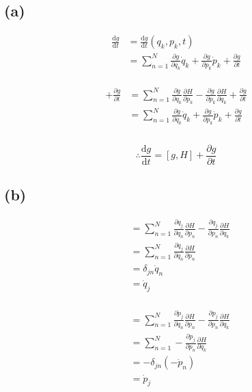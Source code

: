 \documentclass[letter, 10pts]{article}
\begin{document}
\subsection*{(a)}
\begin{minipage}{0.5\textwidth}
	\begin{align*}
		\frac{\mathrm{d} g}{\mathrm{d} t} 
		&= 
		\frac{\mathrm{d} g}{\mathrm{d} t}\left(
		q_k, p_k, t\right)\\
		&= 
		\sum_{n=1}^{N} 
		\frac{\partial g}{\partial q_k} 
		\dot{q}_k + 
		\frac{\partial g}{\partial p_k}
		\dot{p}_k + 
		\frac{\partial g}{\partial t}\\
	\end{align*}
\end{minipage}\hfill 
\begin{minipage}{0.5\textwidth}
\begin{align*}
	[g,H] + \frac{\partial g}{\partial t} 
	&= 
	\sum_{n=1}^{N} \frac{\partial g}{\partial q_k} 
	\frac{\partial H}{\partial p_k} - 
	\frac{\partial g}{\partial p_k} 
	\frac{\partial H}{\partial q_k} + \frac{\partial g}{\partial t}\\
	&= 
		\sum_{n=1}^{N} 
		\frac{\partial g}{\partial q_k} 
		\dot{q}_k + 
		\frac{\partial g}{\partial p_k}
		\dot{p}_k + 
		\frac{\partial g}{\partial t}\\
	\\
\end{align*}	
\end{minipage}
\[
	\therefore \frac{\mathrm{d} g}{\mathrm{d} t} = [g,H]+ \frac{\partial g}{\partial t}
\] 


\subsection*{(b)} 
\begin{minipage}{0.5\textwidth}
\begin{align*}
	[q_j, H] &= \sum_{n=1}^{N} \frac{\partial q_j}{\partial q_n} 
	\frac{\partial H}{\partial p_n}-
	\frac{\partial q_j}{\partial p_n} 
	\frac{\partial H}{\partial q_k}\\
	&= \sum_{n=1}^{N} \frac{\partial q_j}{\partial q_n} 
	\frac{\partial H}{\partial p_n}
		 \\ &= \delta_{jn} \dot q_n
		 \\
		 &= \dot q_j \\
\end{align*}	
\end{minipage} \hfill 
\begin{minipage}{0.5\textwidth}
\begin{align*}
	[p_j, H] &= \sum_{n=1}^{N} \frac{\partial p_j}{\partial q_n} 
	\frac{\partial H}{\partial p_n}-
	\frac{\partial p_j}{\partial p_n} 
	\frac{\partial H}{\partial q_k}\\
	&= \sum_{n=1}^{N} 
	- \frac{\partial p_j}{\partial p_n} 
	\frac{\partial H}{\partial q_k}\\
		 &= - \delta_{jn} (- \dot p_n) \\
		 &= \dot p_j \\
\end{align*}	
\end{minipage}
\end{document}
